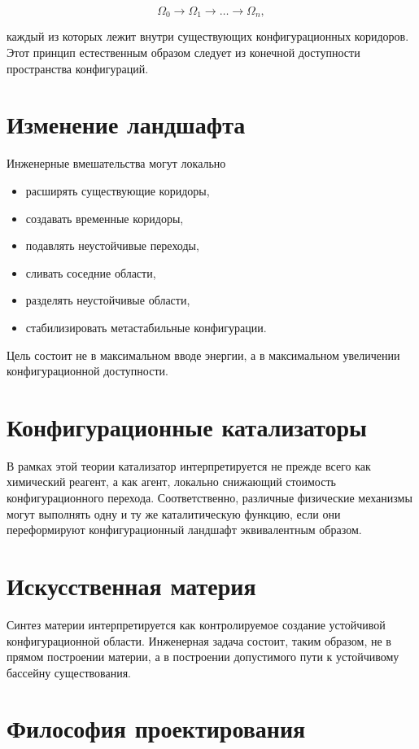 \[ \Omega_0 \rightarrow \Omega_1 \rightarrow \dots \rightarrow \Omega_n, \]

каждый из которых лежит внутри существующих конфигурационных коридоров. Этот принцип естественным образом следует из конечной доступности пространства конфигураций.

\section{Изменение ландшафта}

Инженерные вмешательства могут локально

\begin{itemize}
\item расширять существующие коридоры,
\item создавать временные коридоры,
\item подавлять неустойчивые переходы,
\item сливать соседние области,
\item разделять неустойчивые области,
\item стабилизировать метастабильные конфигурации.
\end{itemize}

Цель состоит не в максимальном вводе энергии, а в максимальном увеличении конфигурационной доступности.

\section{Конфигурационные катализаторы}

В рамках этой теории катализатор интерпретируется не прежде всего как химический реагент, а как агент, локально снижающий стоимость конфигурационного перехода. Соответственно, различные физические механизмы могут выполнять одну и ту же каталитическую функцию, если они переформируют конфигурационный ландшафт эквивалентным образом.

\section{Искусственная материя}

Синтез материи интерпретируется как контролируемое создание устойчивой конфигурационной области. Инженерная задача состоит, таким образом, не в прямом построении материи, а в построении допустимого пути к устойчивому бассейну существования.

\section{Философия проектирования}


